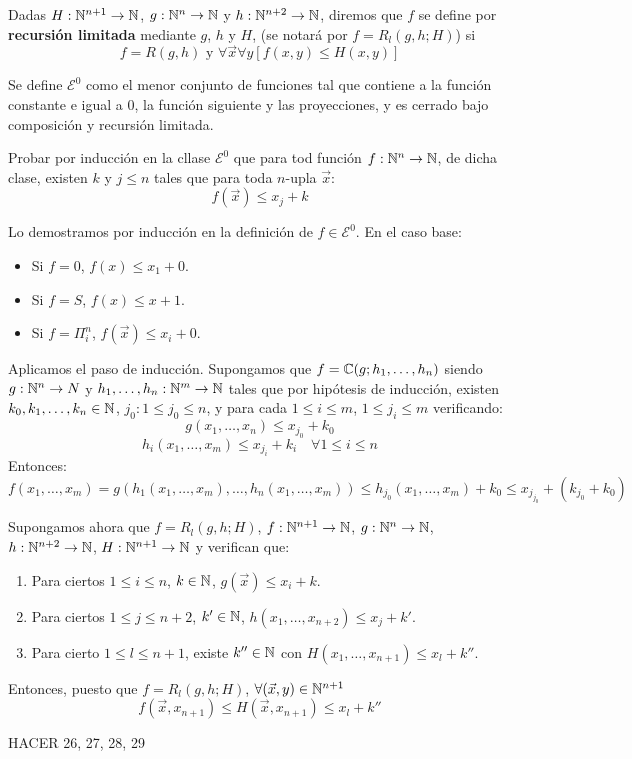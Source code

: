 \documentclass[twoside]{article}
\begin{document}
\newpage
\begin{ejercicio}{30}
Dadas $H : \mathbb{N}^{n+1} \to \mathbb{N}$, $g : \mathbb{N}^n \to \mathbb{N}$ y $h : \mathbb{N}^{n+2} \to \mathbb{N}$, diremos que $f$ se define por \textbf{recursión limitada} mediante $g$, $h$ y $H$, (se notará por $f = R_l(g,h;H)$) si
\[ f = R(g,h) \text{ y } \forall \vec{x} \forall y [f(x,y) ≤ H(x,y)] \]

Se define $\mathcal{E}^0$ como el menor conjunto de funciones tal que contiene a la función constante e igual a $0$, la función siguiente y las proyecciones, y es cerrado bajo composición y recursión limitada.

Probar por inducción en la cllase $\mathcal{E}^0$ que para tod función $f : \mathbb{N}^n \to \mathbb{N}$, de dicha clase, existen $k$ y $j ≤ n$ tales que para toda $n$-upla $\vec{x}$:
\[ f(\vec{x}) ≤ x_j + k \]
\end{ejercicio}
\begin{sol}
Lo demostramos por inducción en la definición de $f \in \mathcal{E}^0$. En el caso base:
\begin{itemize}
	\item Si $f = 0$, $f(x) ≤ x_1+0$.
	\item Si $f = S$, $f(x) ≤ x+1$.
	\item Si $f = Π_i^n$, $f(\vec{x}) ≤ x_i+0$.
\end{itemize}
Aplicamos el paso de inducción. Supongamos que $f = \mathbb{C}(g;h_1,\dots,h_n)$ siendo $g : \mathbb{N}^n \to N$ y $h_1,\dots,h_n : \mathbb{N}^m \to \mathbb{N}$ tales que por hipótesis de inducción, existen $k_0,k_1,\dots,k_n \in \mathbb{N}$, $j_0 : 1 ≤ j_0≤n$, y para cada $1≤i≤m$, $1≤j_i≤m$ verificando:
\[ g(x_1,\dots,x_n) ≤ x_{j_0}+k_0 \]
\[ h_i(x_1,\dots,x_m) ≤ x_{j_i} + k_i \quad \forall 1≤i≤n\]
Entonces:
\[ f(x_1,\dots,x_m) = g(h_1(x_1,\dots,x_m),\dots,h_n(x_1,\dots,x_m)) ≤ h_{j_0}(x_1,\dots,x_m) + k_0 ≤ x_{j_{j_0}} + (k_{j_0} + k_0) \]

Supongamos ahora que $f = R_l(g,h;H)$, $f : \mathbb{N}^{n+1} \to \mathbb{N}$, $g : \mathbb{N}^n \to \mathbb{N}$, $h : \mathbb{N}^{n+2} \to \mathbb{N}$, $H : \mathbb{N}^{n+1}\to\mathbb{N}$ y verifican que:
\begin{enumerate}
	\item Para ciertos $1≤i≤n$, $k \in \mathbb{N}$, $g(\vec{x})≤x_i+k$.
	\item Para ciertos $1≤j≤n+2$, $k' \in \mathbb{N}$, $h(x_1,\dots,x_{n+2})≤x_j+k'$.
	\item  Para cierto $1≤l≤n+1$, existe $k'' \in \mathbb{N}$ con $H(x_1,\dots,x_{n+1}) ≤ x_l + k''$.
\end{enumerate}
Entonces, puesto que $f = R_l(g,h;H)$, $\forall (\vec{x},y) \in \mathbb{N}^{n+1}$
\[ f(\vec{x},x_{n+1}) ≤ H(\vec{x},x_{n+1}) ≤ x_l + k'' \]
\end{sol}

HACER 26, 27, 28, 29
\end{document}
